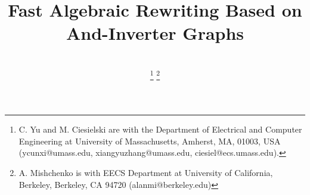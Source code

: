 \documentclass[journal, 10pt]{IEEEtran}
\begin{document}

\title{{\huge Fast Algebraic Rewriting Based on And-Inverter Graphs}}


%
%

\author{\\
\thanks{C. Yu and M. Ciesielski are with the Department of Electrical and Computer Engineering at University of Massachusetts, Amherst, MA, 01003, USA (ycunxi@umass.edu, xiangyuzhang@umass.edu, ciesiel@ecs.umass.edu).}
\thanks{A. Mishchenko is with EECS Department at University of California, Berkeley, Berkeley, CA 94720 (alanmi@berkeley.edu)}
}



%
%


\maketitle
\end{document}
